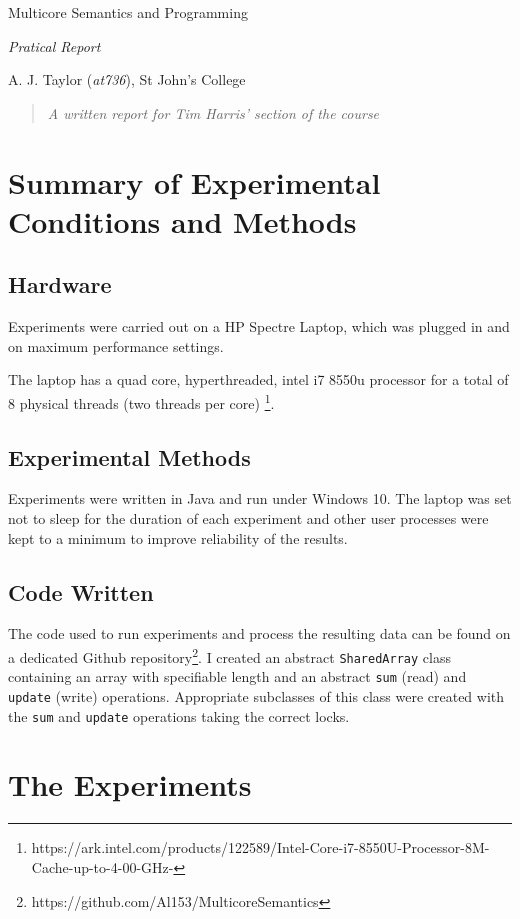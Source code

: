 \documentclass[11pt]{article}
\begin{document}
\centerline{\Large Multicore Semantics and Programming}
\vspace{2em}
\centerline{\Large \emph{Pratical Report}}
\vspace{2em}
\centerline{\large A. J. Taylor (\emph{at736}), St John's College}
\vspace{1em}

\begin{abstract}
\textsl{
	A written report for Tim Harris' section of the course
} 
\end{abstract}


\section{Summary of Experimental Conditions and Methods}

\subsection{Hardware}
Experiments were carried out on a HP Spectre Laptop, which was plugged in and on maximum performance settings. 

The laptop has a quad core, hyperthreaded, intel i7 8550u processor for a total of 8 physical threads (two threads per core) \footnote{https://ark.intel.com/products/122589/Intel-Core-i7-8550U-Processor-8M-Cache-up-to-4-00-GHz-}.

\subsection{Experimental Methods}
Experiments were written in Java and run under Windows 10. The laptop was set not to sleep for the duration of each experiment and other user processes were kept to a minimum to improve reliability of the results.

\subsection{Code Written}
The code used to run experiments and process the resulting data can be found on a dedicated Github repository\footnote{https://github.com/Al153/MulticoreSemantics}. I created an abstract \texttt{SharedArray} class containing an array with specifiable length and an abstract \texttt{sum} (read) and \texttt{update} (write) operations. Appropriate subclasses of this class were created with the \texttt{sum} and \texttt{update} operations taking the correct locks.


\section{The Experiments}
\end{document}
